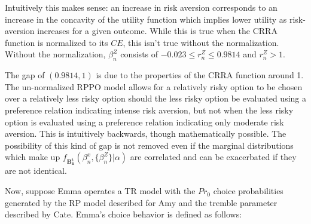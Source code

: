\documentclass[11pt,a4paper]{report}
\newcommand\CE{\ensuremath{\mathit{CE}}}    %
\newcommand\Prob{\ensuremath{\mathit{Pr}}}  %
\begin{document}
Intuitively this makes sense: an increase in risk aversion corresponds to an increase in the concavity of the utility function which implies lower utility as risk-aversion increases for a given outcome.
While this is true when the CRRA function is normalized to its {\CE}, this isn't true without the normalization.
Without the normalization, $\beta_n^Z$ consists of $-0.023 \leq r_n^Z \leq 0.9814$ and $r_n^Z > 1$.

The gap of $(0.9814,1)$ is due to the properties of the CRRA function around 1.
The un-normalized RPPO model allows for a relatively risky option to be chosen over a relatively less risky option should the less risky option be evaluated using a preference relation indicating intense risk aversion, but not when the less risky option is evaluated using a preference relation indicating only moderate risk aversion.
This is intuitively backwards, though mathematically possible.
The possibility of this kind of gap is not removed even if the marginal distributions which make up $f_{\mathbf{B^t_n}}(\beta_n^x,\{\beta_n^Z\}|\alpha)$ are correlated and can be exacerbated if they are not identical.

Now, suppose Emma operates a TR model with the ${\Prob}_0$ choice probabilities generated by the RP model described for Amy and the tremble parameter described by Cate.
Emma's choice behavior is defined as follows:
\end{document}
